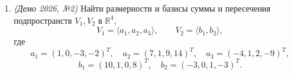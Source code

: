 \begin{enumerate}
Приводим к ступенчатому виду:
\[
\begin{pmatrix}
    1 & 1 & 1 & 1 & 0 \\
    1 & 1 & -1 & -1 & -1 \\
    2 & 2 & 0 & 0 & -1 \\
    1 & 1 & 5 & 5 & 2 \\
    1 & -1 & -1 & 0 & 0
\end{pmatrix}
\xrightarrow{\,\, (2)-(1),\ (3)-2(1),\ (4)-(1),\ (5)-(1) \,\,}
\begin{pmatrix}
    1 & 1 & 1 & 1 & 0 \\
    0 & 0 & -2 & -2 & -1 \\
    0 & 0 & -2 & -2 & -1 \\
    0 & 0 & 4 & 4 & 2 \\
    0 & -2 & -2 & -1 & 0
\end{pmatrix}
\]
\[
\xrightarrow{\,\, (3)-(2),\ (4)+2(2) \,\,}
\begin{pmatrix}
    1 & 1 & 1 & 1 & 0 \\
    0 & 0 & -2 & -2 & -1 \\
    0 & 0 & 0 & 0 & 0 \\
    0 & 0 & 0 & 0 & 0 \\
    0 & -2 & -2 & -1 & 0
\end{pmatrix}
\xrightarrow{\,\, (2) \leftrightarrow (5) \,\,}
\begin{pmatrix}
    1 & 1 & 1 & 1 & 0 \\
    0 & -2 & -2 & -1 & 0 \\
    0 & 0 & -2 & -2 & -1 \\
    0 & 0 & 0 & 0 & 0 \\
    0 & 0 & 0 & 0 & 0
\end{pmatrix}.
\]

Осталось 3 ненулевые строки, значит,
\[
\dim L = 3.
\]

В качестве базиса можно взять
\[
a_1,\ a_2,\ a_5.
\]

\item \textit{(Демо 2026, №2)} Найти размерности и базисы суммы и пересечения подпространств $V_1, V_2$ в $\mathbb{R}^4$,
\[
V_1 = \langle a_1, a_2, a_3 \rangle,\qquad
V_2 = \langle b_1, b_2 \rangle,
\]
где
\[
a_1 = (1, 0, -3, -2)^T,\quad
a_2 = (7, 1, 9, 14)^T,\quad
a_3 = (-4, 1, 2, -9)^T,
\]
\[
b_1 = (10, 1, 0, 8)^T,\quad
b_2 = (-3, 0, 1, -3)^T.
\]


\end{enumerate}
